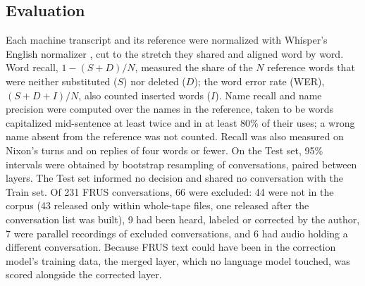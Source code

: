 \subsection{Evaluation}
\label{sec:eval}

Each machine transcript and its reference were normalized with Whisper's English normalizer \citep{radford2023whisper}, cut to the stretch they shared and aligned word by word. Word recall, $1-(S+D)/N$, measured the share of the $N$ reference words that were neither substituted ($S$) nor deleted ($D$); the word error rate (WER), $(S+D+I)/N$, also counted inserted words ($I$). Name recall and name precision were computed over the names in the reference, taken to be words capitalized mid-sentence at least twice and in at least 80\% of their uses; a wrong name absent from the reference was not counted. Recall was also measured on Nixon's turns and on replies of four words or fewer. On the Test set, 95\% intervals were obtained by bootstrap resampling of conversations, paired between layers. The Test set informed no decision and shared no conversation with the Train set. Of 231 FRUS conversations, 66 were excluded: 44 were not in the corpus (43 released only within whole-tape files, one released after the conversation list was built), 9 had been heard, labeled or corrected by the author, 7 were parallel recordings of excluded conversations, and 6 had audio holding a different conversation. Because FRUS text could have been in the correction model's training data, the merged layer, which no language model touched, was scored alongside the corrected layer.
